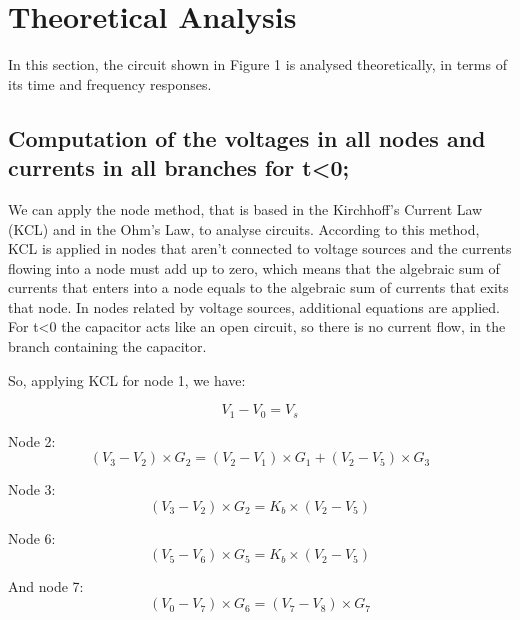 \section{Theoretical Analysis}
\label{sec:analysis}

In this section, the circuit shown in Figure 1 is analysed
theoretically, in terms of its time and frequency responses. 

\subsection{Computation of the voltages in all nodes and currents in all branches for t\textless 0;}

We can apply the node method, that is based in the Kirchhoff's Current Law (KCL) and in the Ohm's Law, to analyse circuits. According to this method, KCL is applied in nodes that aren't connected to voltage sources and the currents flowing into a node must add up to zero, which means that the algebraic sum of currents that enters into a node equals to the algebraic sum of currents that exits that node. In nodes related by voltage sources, additional equations are applied. 
For t\textless0 the capacitor acts like an open circuit, so there is no current flow, in the branch containing the capacitor.\par
\par
So, applying KCL for node 1, we have: 

\begin {equation}
V_1 - V_0= V_s
  \label {eq:kvl}
\end{equation}

Node 2:
\begin {equation}
  (V_3 - V_2)\times G_2 = (V_2 - V_1)\times G_1 + (V_2 - V_5)\times G_3
  \label {eq:kvl}
\end{equation}

Node 3:
\begin{equation}
(V_3- V_2)\times G_2 = K_b\times (V_2 - V_5)
  \label {eq:kvl}
\end{equation}

Node 6:
\begin {equation}
(V_5 - V_6)\times G_5 = K_b\times (V_2 - V_5)
  \label {eq:kvl}
\end{equation}

And node 7:
\begin {equation}
(V_0-V_7)\times G_6 = (V_7 - V_8)\times G_7
  \label {eq:kvl}
\end{equation}

